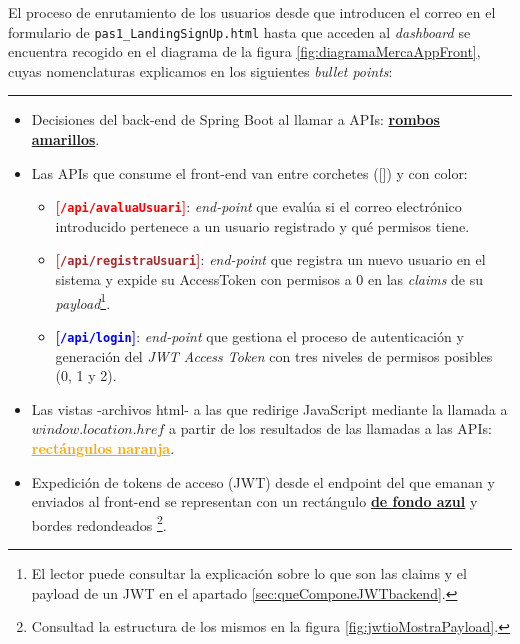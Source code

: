 \documentclass[a4paper,12pt]{report}
\begin{document}
	El proceso de enrutamiento de los usuarios desde que introducen el correo en el formulario de \texttt{pas1\_LandingSignUp.html} hasta que acceden al \textit{dashboard} se encuentra recogido en el diagrama de la figura \ref{fig:diagramaMercaAppFront}, cuyas nomenclaturas explicamos en los siguientes \textit{bullet points}:
	\vspace{1em}
	\hrule
	
	\begin{itemize}
		\setlength{\itemsep}{-.3em}
		
		\item Decisiones del back-end de Spring Boot al llamar a APIs: \textbf{\textcolor{yellow!75!black}{\underline{rombos amarillos}}}. %
		\item Las APIs que consume el front-end van entre corchetes ([]) y con color:
		\begin{itemize}
			\setlength{\itemsep}{.0em}
			\item \textbf{\textcolor{red}{[\texttt{/api/avaluaUsuari}]}}: \textit{end-point} que evalúa si el correo electrónico introducido pertenece a un usuario registrado y qué permisos tiene.
			\item \textbf{\textcolor{brown}{[\texttt{/api/registraUsuari}]}}: \textit{end-point} que registra un nuevo usuario en el sistema y expide su AccessToken con permisos a 0 en las \textit{claims} de su \textit{payload}\footnote{El lector puede consultar la explicación sobre lo que son las claims y el payload de un JWT en el apartado \ref{sec:queComponeJWTbackend}.}.
			\item \textbf{\textcolor{blue}{[\texttt{/api/login}]}}: \textit{end-point} que gestiona el proceso de autenticación y generación del \textit{JWT Access Token} con tres niveles de permisos posibles (0, 1 y 2).
		\end{itemize}
		
		
		
		\item Las vistas -archivos html- a las que redirige JavaScript mediante la llamada a $window.location.href$ a partir de los resultados de las llamadas a las APIs:  \textbf{\textcolor{orange}{\underline{rectángulos naranja}}}.
		
		\item Expedición de tokens de acceso (JWT) desde el endpoint del que emanan y enviados al front-end se representan con un rectángulo \textbf{\textcolor{blue!40!white}{\underline{de fondo azul}}} y bordes redondeados \footnote{Consultad la estructura de los mismos en la figura \ref{fig:jwtioMostraPayload}.}.
		
	\end{itemize}
	
\end{document}
